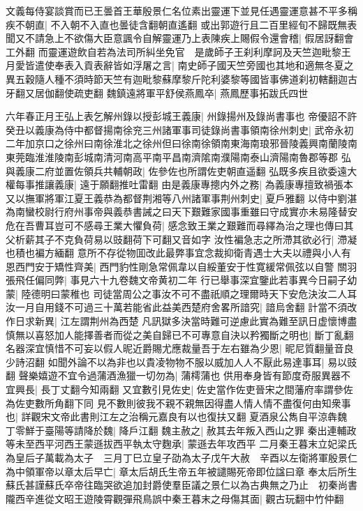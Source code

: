 文義每侍宴談賞而已王曇首王華殷景仁名位素出靈運下並見任遇靈運意甚不平多稱疾不朝直|{
	不入朝不入直也曇徒含翻朝直遙翻}
或出郭遊行且二百里經旬不歸既無表聞又不請急上不欲傷大臣意諷令自解靈運乃上表陳疾上賜假令還會稽|{
	假居訝翻會工外翻}
而靈運遊飲自若為法司所糾坐免官　是歲師子王刹利摩訶及天竺迦毗黎王月愛皆遣使奉表入貢表辭皆如浮屠之言|{
	南史師子國天竺旁國也其地和適無冬夏之異五穀隨人種不須時節天竺有迦毗黎蘇摩黎斤陀利婆黎等國皆事佛道刹初轄翻迦古牙翻又居伽翻使疏吏翻}
魏鎮遠將軍平舒侯燕鳳卒|{
	燕鳳歷事拓跋氏四世}


六年春正月王弘上表乞解州錄以授彭城王義康|{
	州錄揚州及錄尚書事也}
帝優詔不許癸丑以義康為侍中都督揚南徐兖三州諸軍事司徒錄尚書事領南徐州刺史|{
	武帝永初二年加京口之徐州曰南徐淮北之徐州但曰徐南徐領南東海南琅邪晉陵義興南蘭陵南東莞臨淮淮陵南彭城南清河南高平南平昌南濟隂南濮陽南泰山濟陽南魯郡等郡}
弘與義康二府並置佐領兵共輔朝政|{
	佐參佐也所謂佐吏朝直遥翻}
弘既多疾且欲委遠大權每事推讓義康|{
	遠于願翻推吐雷翻}
由是義康專摠内外之務|{
	為義康專擅致禍張本}
又以撫軍將軍江夏王義恭為都督荆湘等八州諸軍事荆州刺史|{
	夏戶雅翻}
以侍中劉湛為南蠻校尉行府州事帝與義恭書誡之曰天下艱難家國事重雖曰守成實亦未易隆替安危在吾曹耳豈可不感尋王業大懼負荷|{
	感念致王業之艱難而尋繹為治之理也傳曰其父析薪其子不克負荷易以豉翻荷下可翻又音如字}
汝性褊急志之所滯其欲必行|{
	滯凝也積也褊方緬翻}
意所不存從物囬改此最弊事宜念裁抑衛青遇士大夫以禮與小人有恩西門安于矯性齊美|{
	西門豹性剛急常佩韋以自綏董安于性寛緩常佩弦以自警}
關羽張飛任偏同弊|{
	事見六十九卷魏文帝黄初二年}
行已舉事深宜鑒此若事異今日嗣子幼蒙|{
	陸德明曰蒙稚也}
司徒當周公之事汝不可不盡祇順之理爾時天下安危決汝二人耳汝一月自用錢不可過三十萬若能省此益美西楚府舍畧所諳究|{
	諳烏舍翻}
計當不須改作日求新異|{
	江左謂荆州為西楚}
凡訊獄多決當時難可逆慮此實為難至訊日虚懷博盡慎無以喜怒加人能擇善者而從之美自歸已不可專意自決以矜獨斷之明也|{
	斷丁亂翻}
名器深宜慎惜不可妄以假人昵近爵賜尤應裁量吾于左右雖為少恩|{
	昵尼質翻量音良少詩沼翻}
如聞外論不以為非也以貴凌物物不服以威加人人不厭此易達事耳|{
	易以豉翻}
聲樂嬉遊不宜令過蒲酒漁獵一切勿為|{
	蒲樗蒲也}
供用奉身皆有節度奇服異器不宜興長|{
	長丁丈翻今知兩翻}
又宜數引見佐史|{
	佐史當作佐吏晉宋之間藩府率謂參佐為佐吏數所角翻下同}
見不數則彼我不親不親無因得盡人情人情不盡復何由知衆事也|{
	詳觀宋文帝此書則江左之治稱元嘉良有以也復扶又翻}
夏酒泉公雋自平涼犇魏　丁零鮮于臺陽等請降於魏|{
	降戶江翻}
魏主赦之|{
	赦其去年叛入西山之罪}
秦出連輔政等未至西平河西王蒙遜拔西平執太守麴承|{
	蒙遜去年攻西平}
二月秦王暮末立妃梁氏為皇后子萬載為太子　三月丁巳立皇子劭為太子戊午大赦　辛酉以左衛將軍殷景仁為中領軍帝以章太后早亡|{
	章太后胡氏生帝五年被譴賜死帝即位諡曰章}
奉太后所生蘇氏甚謹蘇氏卒帝往臨哭欲追加封爵使羣臣議之景仁以為古典無之乃止　初秦尚書隴西辛進從文昭王遊陵霄觀彈飛鳥誤中秦王暮末之母傷其面|{
	觀古玩翻中竹仲翻}
